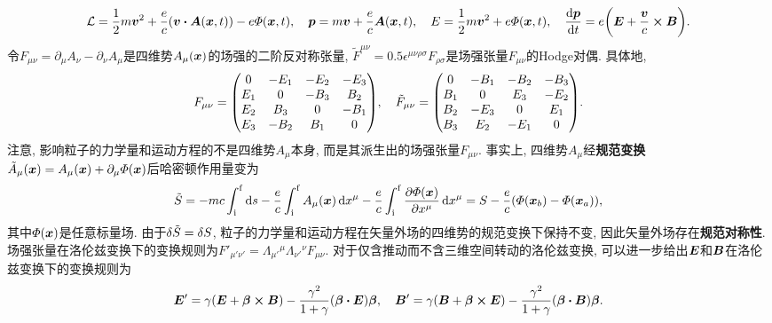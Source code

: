 \begin{equation*}
    \lagr = \frac{1}{2} m\vb*{v}^2 + \frac{e}{c} (\vb*{v} \vdot \vb*{A}(\vb*{x},t)) - e \varPhi(\vb*{x},t), \quad \vb*{p} = m \vb*{v} + \frac{e}{c} \vb*{A}(\vb*{x},t), \quad E = \frac{1}{2} m\vb*{v}^2 + e \varPhi(\vb*{x},t), \quad \dv{\vb*{p}}{t} = e \bigg( \vb*{E} + \frac{\vb*{v}}{c} \cross \vb*{B} \bigg).
\end{equation*}
令$ F_{\mu\nu}=\partial_{\mu}A_{\nu} - \partial_{\nu}A_{\mu} $是四维势$ A_{\mu} (\vb*{x}) $的场强的二阶反对称张量, $ \tilde{F}^{\mu\nu} = 0.5 \epsilon^{\mu\nu\rho\sigma} F_{\rho\sigma} $是场强张量$ F_{\mu\nu} $的Hodge对偶. 具体地,
\begin{equation*}
    F_{\mu\nu} = \mqty( 0 & -E_1 & -E_2 & -E_3 \\ E_1 & 0 & -B_3 & B_2 \\ E_2 & B_3 & 0 & -B_1 \\ E_3 & -B_2 & B_1 & 0 ), \quad \tilde{F}_{\mu\nu} = \mqty( 0 & -B_1 & -B_2 & -B_3 \\ B_1 & 0 & E_3 & -E_2 \\ B_2 & -E_3 & 0 & E_1 \\ B_3 & E_2 & -E_1 & 0 ).
\end{equation*}
注意, 影响粒子的力学量和运动方程的不是四维势$ A_{\mu} $本身, 而是其派生出的场强张量$ F_{\mu\nu} $. 事实上, 四维势$ A_{\mu} $经\textbf{规范变换}$ \tilde{A}_{\mu}(\vb*{x}) = A_{\mu}(\vb*{x}) + \partial_{\mu} \varPhi(\vb*{x}) $后哈密顿作用量变为
\begin{equation*}
    \tilde{S} = -mc \int_{\mathrm{i}}^{\mathrm{f}} \dd{s} - \frac{e}{c} \int_{\mathrm{i}}^{\mathrm{f}} A_{\mu} (\vb*{x}) \dd{x^{\mu}} - \frac{e}{c} \int_{\mathrm{i}}^{\mathrm{f}} \pdv{\varPhi(\vb*{x})}{x^{\mu}} \dd{x^{\mu}} = S - \frac{e}{c} (\varPhi(\vb*{x}_b) - \varPhi(\vb*{x}_a)),
\end{equation*}
其中$ \varPhi(\vb*{x}) $是任意标量场. 由于$ \var{\tilde{S}} = \var{S} $, 粒子的力学量和运动方程在矢量外场的四维势的规范变换下保持不变, 因此矢量外场存在\textbf{规范对称性}. 场强张量在洛伦兹变换下的变换规则为$ F'_{\mu'\nu'} = \varLambda_{\mu'}{}^{\mu} \varLambda_{\nu'}{}^{\nu} F_{\mu\nu} $. 对于仅含推动而不含三维空间转动的洛伦兹变换, 可以进一步给出$ \vb*{E} $和$ \vb*{B} $在洛伦兹变换下的变换规则为
\begin{equation*}
    \vb*{E}' = \gamma (\vb*{E} + \vb*{\beta} \cross \vb*{B}) - \frac{\gamma^2}{1+\gamma} (\vb*{\beta} \vdot \vb*{E}) \vb*{\beta}, \quad \vb*{B}' = \gamma (\vb*{B} + \vb*{\beta} \cross \vb*{E}) - \frac{\gamma^2}{1+\gamma} (\vb*{\beta} \vdot \vb*{B}) \vb*{\beta}.
\end{equation*}
